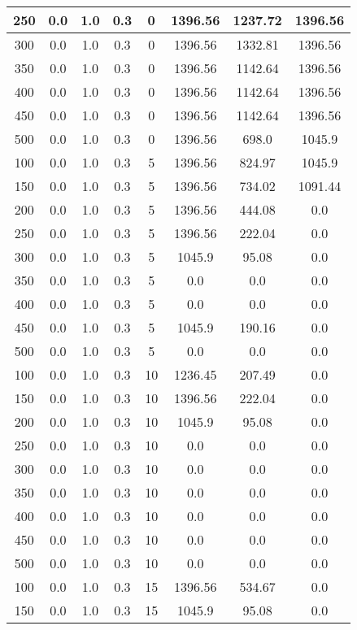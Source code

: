 \documentclass[a4paper, 12pt]{extreport}
\begin{document}
\begin{itemize}
\begin{longtable}{|c|c|c|c|c|c|c|c|}
			250 & 0.0 & 1.0 & 0.3 & 0 & 1396.56 & 1237.72 & 1396.56 \\\hline
			300 & 0.0 & 1.0 & 0.3 & 0 & 1396.56 & 1332.81 & 1396.56 \\\hline
			350 & 0.0 & 1.0 & 0.3 & 0 & 1396.56 & 1142.64 & 1396.56 \\\hline
			400 & 0.0 & 1.0 & 0.3 & 0 & 1396.56 & 1142.64 & 1396.56 \\\hline
			450 & 0.0 & 1.0 & 0.3 & 0 & 1396.56 & 1142.64 & 1396.56 \\\hline
			500 & 0.0 & 1.0 & 0.3 & 0 & 1396.56 & 698.0 & 1045.9 \\\hline
			100 & 0.0 & 1.0 & 0.3 & 5 & 1396.56 & 824.97 & 1045.9 \\\hline
			150 & 0.0 & 1.0 & 0.3 & 5 & 1396.56 & 734.02 & 1091.44 \\\hline
			200 & 0.0 & 1.0 & 0.3 & 5 & 1396.56 & 444.08 & 0.0 \\\hline
			250 & 0.0 & 1.0 & 0.3 & 5 & 1396.56 & 222.04 & 0.0 \\\hline
			300 & 0.0 & 1.0 & 0.3 & 5 & 1045.9 & 95.08 & 0.0 \\\hline
			350 & 0.0 & 1.0 & 0.3 & 5 & 0.0 & 0.0 & 0.0 \\\hline
			400 & 0.0 & 1.0 & 0.3 & 5 & 0.0 & 0.0 & 0.0 \\\hline
			450 & 0.0 & 1.0 & 0.3 & 5 & 1045.9 & 190.16 & 0.0 \\\hline
			500 & 0.0 & 1.0 & 0.3 & 5 & 0.0 & 0.0 & 0.0 \\\hline
			100 & 0.0 & 1.0 & 0.3 & 10 & 1236.45 & 207.49 & 0.0 \\\hline
			150 & 0.0 & 1.0 & 0.3 & 10 & 1396.56 & 222.04 & 0.0 \\\hline
			200 & 0.0 & 1.0 & 0.3 & 10 & 1045.9 & 95.08 & 0.0 \\\hline
			250 & 0.0 & 1.0 & 0.3 & 10 & 0.0 & 0.0 & 0.0 \\\hline
			300 & 0.0 & 1.0 & 0.3 & 10 & 0.0 & 0.0 & 0.0 \\\hline
			350 & 0.0 & 1.0 & 0.3 & 10 & 0.0 & 0.0 & 0.0 \\\hline
			400 & 0.0 & 1.0 & 0.3 & 10 & 0.0 & 0.0 & 0.0 \\\hline
			450 & 0.0 & 1.0 & 0.3 & 10 & 0.0 & 0.0 & 0.0 \\\hline
			500 & 0.0 & 1.0 & 0.3 & 10 & 0.0 & 0.0 & 0.0 \\\hline
			100 & 0.0 & 1.0 & 0.3 & 15 & 1396.56 & 534.67 & 0.0 \\\hline
			150 & 0.0 & 1.0 & 0.3 & 15 & 1045.9 & 95.08 & 0.0 \\\hline

\end{longtable}
\end{itemize}
\end{document}
